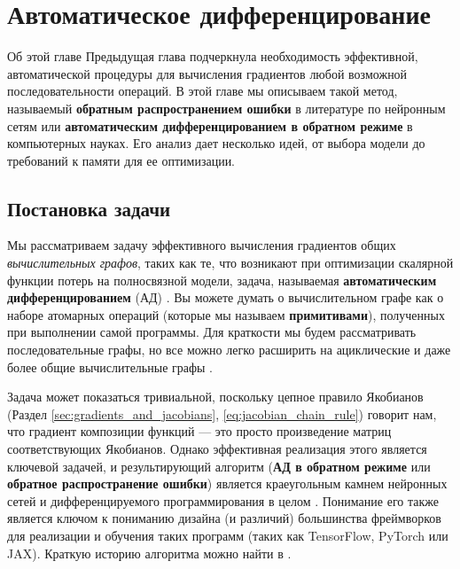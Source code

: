 \chapter{Автоматическое дифференцирование}
\label{chap:automatic_differentiation}

\begin{supportbox}{Об этой главе}
Предыдущая глава подчеркнула необходимость эффективной, автоматической процедуры для вычисления градиентов любой возможной последовательности операций. В этой главе мы описываем такой метод, называемый \textbf{обратным распространением ошибки} в литературе по нейронным сетям или \textbf{автоматическим дифференцированием в обратном режиме} в компьютерных науках. Его анализ дает несколько идей, от выбора модели до требований к памяти для ее оптимизации.
\end{supportbox}

\section{Постановка задачи}

Мы рассматриваем задачу эффективного вычисления градиентов общих \textit{вычислительных графов}, таких как те, что возникают при оптимизации скалярной функции потерь на полносвязной модели, задача, называемая \textbf{автоматическим дифференцированием} (АД) \cite{baydin2018automatic}. Вы можете думать о вычислительном графе как о наборе атомарных операций (которые мы называем \textbf{примитивами}), полученных при выполнении самой программы. Для краткости мы будем рассматривать последовательные графы, но все можно легко расширить на ациклические и даже более общие вычислительные графы \cite{griewank2008evaluating,blondel2024elements} .

Задача может показаться тривиальной, поскольку цепное правило Якобианов (Раздел \ref{sec:gradients_and_jacobians}, \eqref{eq:jacobian_chain_rule}) говорит нам, что градиент композиции функций — это просто произведение матриц соответствующих Якобианов. Однако эффективная реализация этого является ключевой задачей, и результирующий алгоритм (\textbf{АД в обратном режиме} или \textbf{обратное распространение ошибки}) является краеугольным камнем нейронных сетей и дифференцируемого программирования в целом \cite{griewank2008evaluating,blondel2024elements}. Понимание его также является ключом к пониманию дизайна (и различий) большинства фреймворков для реализации и обучения таких программ (таких как TensorFlow, PyTorch или JAX). Краткую историю алгоритма можно найти в \cite{griewank2012invented}.

